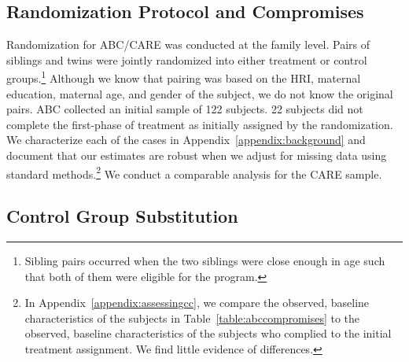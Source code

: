 \subsection{Randomization Protocol and Compromises} \label{section:randomization}

Randomization for ABC/CARE was conducted at the family level. Pairs of siblings and twins were jointly randomized into either treatment or control groups.\footnote{Sibling pairs occurred when the two siblings were close enough in age such that both of them were eligible for the program.} Although we know that pairing was based on the HRI, maternal education, maternal age, and gender of the subject, we do not know the original pairs. ABC collected an initial sample of 122 subjects. 22 subjects did not complete the first-phase of treatment as initially assigned by the randomization. We characterize each of the cases in Appendix~\ref{appendix:background} and document that our estimates are robust when we adjust for missing data using standard methods.\footnote{In Appendix~\ref{appendix:assessingcc}, we compare the observed, baseline characteristics of the subjects in Table~\ref{table:abccompromises} to the observed, baseline characteristics of the subjects who complied to the initial treatment assignment. We find little evidence of differences.} We conduct a comparable analysis for the CARE sample.

\subsection{Control Group Substitution}


